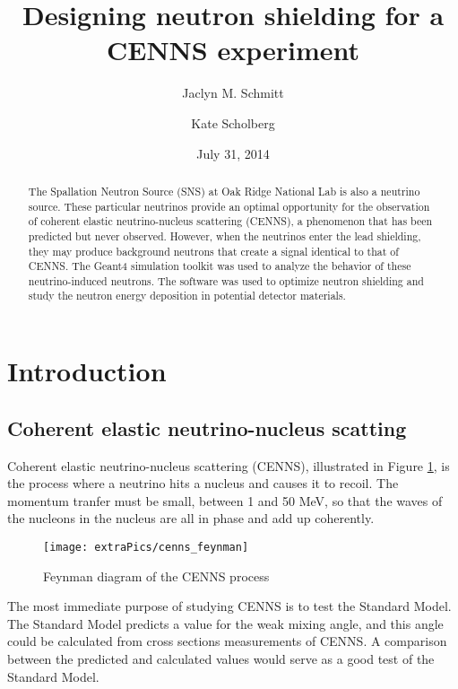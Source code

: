 \documentclass[12pt]{article}
\begin{document}
\title{Designing neutron shielding for a CENNS experiment}

\author[1]{Jaclyn M. Schmitt}
\author[2]{Kate Scholberg}
\date{July 31, 2014}

\maketitle

\begin{abstract}
The Spallation Neutron Source (SNS) at Oak Ridge National Lab is also a neutrino source. These particular neutrinos provide an optimal opportunity for the observation of coherent elastic neutrino-nucleus scattering (CENNS), a phenomenon that has been predicted but never observed. However, when the neutrinos enter the lead shielding, they may produce background neutrons that create a signal identical to that of CENNS. The Geant4 simulation toolkit was used to analyze the behavior of these neutrino-induced neutrons. The software was used to optimize neutron shielding and study the neutron energy deposition in potential detector materials.
\end{abstract}
\newpage

\section{Introduction}

\subsection{Coherent elastic neutrino-nucleus scatting \cite{CSI}}

Coherent elastic neutrino-nucleus scattering (CENNS), illustrated in Figure \ref{fig:cenns}, is the process where a neutrino hits a nucleus and causes it to recoil. The momentum tranfer must be small, between 1 and 50 MeV, so that the waves of the nucleons in the nucleus are all in phase and add up coherently.

\begin{figure}[H]
  \caption{Feynman diagram of the CENNS process \cite{ppt}}
  \texttt{[image: extraPics/cenns\_feynman]}
  \label{fig:cenns}
  \centering
\end{figure}

The most immediate purpose of studying CENNS is to test the Standard Model. The Standard Model predicts a value for the weak mixing angle, and this angle could be calculated from cross sections measurements of CENNS. A comparison between the predicted and calculated values would serve as a good test of the Standard Model.
\end{document}
